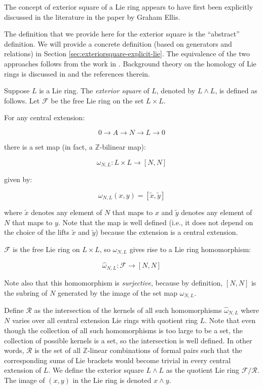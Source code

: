 The concept of exterior square of a Lie ring appears to have first
been explicitly discussed in the literature in the paper
\cite{EllisLie} by Graham Ellis.

The definition that we provide here for the exterior square is the
``abstract'' definition. We will provide a concrete definition (based
on generators and relations) in Section
\ref{sec:exteriorsquare-explicit-lie}. The equivalence of the two
approaches follows from the work in \cite{EllisLie}. Background theory
on the homology of Lie rings is discussed in
\cite{SchurmultiplierandLazard} and the references therein.

Suppose $L$ is a Lie ring. The {\em exterior square} of $L$, denoted by
$L \wedge L$, is defined as follows. Let $\mathcal{F}$ be the free
Lie ring on the set $L \times L$. 

For any central extension:

$$0 \to A \to N \to L \to 0$$

there is a set map (in fact, a $\mathbb{Z}$-bilinear map):

$$\omega_{N,L}: L \times L \to [N,N]$$

given by:

$$\omega_{N,L}(x,y) = [\tilde{x},\tilde{y}]$$

where $\tilde{x}$ denotes any element of $N$ that maps to $x$ and
$\tilde{y}$ denotes any element of $N$ that maps to $y$. Note that the
map is well defined (i.e., it does not depend on the choice of the
lifts $\tilde{x}$ and $\tilde{y}$) because the extension is a central
extension.

$\mathcal{F}$ is the free Lie ring on $L \times L$, so $\omega_{N,L}$
gives rise to a Lie ring homomorphism:

$$\hat{\omega}_{N,L}:\mathcal{F} \to [N,N]$$

Note also that this homomorphism is {\em surjective}, because by
definition, $[N,N]$ is the subring of $N$ generated by the image of the
set map $\omega_{N,L}$.

Define $\mathcal{R}$ as the intersection of the kernels of all such
homomorphisms $\hat{\omega}_{N,L}$ where $N$ varies over all central
extension Lie rings with quotient ring $L$. Note that even though the
collection of all such homomorphisms is too large to be a set, the
collection of possible kernels is a set, so the intersection is well
defined. In other words, $\mathcal{R}$ is the set of all
$\mathbb{Z}$-linear combinations of formal pairs such that the
corresponding sums of Lie brackets would become trivial in every
central extension of $L$. We define the exterior square $L \wedge L$
as the quotient Lie ring $\mathcal{F}/\mathcal{R}$. The image of $(x,y)$
in the Lie ring is denoted $x \wedge y$.

